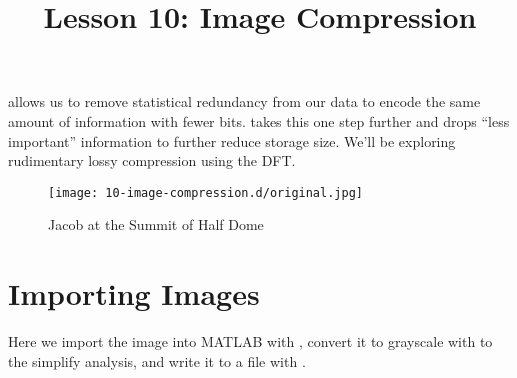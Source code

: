 \documentclass{article}
\title{Lesson 10: Image Compression}
\begin{document}
\renderTitle

 allows us to remove statistical redundancy from our
data to encode the same amount of information with fewer bits.
 takes this one step further and drops
\enquote{less important} information to further reduce storage size.
We'll be exploring rudimentary lossy compression using the DFT.

\begin{figure}[ht!]
	\texttt{[image: 10-image-compression.d/original.jpg]}
	\caption{Jacob at the Summit of Half Dome}
\end{figure}

\section{Importing Images}


Here we import the image into MATLAB with , convert it to
grayscale with  to the simplify analysis, and write it to a
file with .
\end{document}
